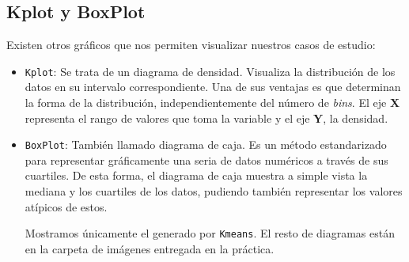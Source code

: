 	
	\begin{figure}[H]
		\centering
		
		
		
	\end{figure}
	
	
	\begin{figure}[H]
		\centering
		
	\end{figure}
	
	
	
	\subsection{Kplot y BoxPlot}
	
	Existen otros gráficos que nos permiten visualizar nuestros casos de estudio:
	\begin{itemize}
		\item \texttt{Kplot}: Se trata de un diagrama de densidad. Visualiza la distribución de los datos en su intervalo correspondiente. Una de sus ventajas es que determinan la forma de la distribución, independientemente del número de \textit{bins}. El eje \textbf{X} representa el rango de valores que toma la variable y el eje \textbf{Y}, la densidad.
		
		
		\begin{figure}[H]
			\centering
			
		\end{figure}
	
	
	
		\item \texttt{BoxPlot}: También llamado diagrama de caja. Es un método estandarizado para representar gráficamente una seria de datos numéricos a través de sus cuartiles. De esta forma, el diagrama de caja muestra a simple vista la mediana y los cuartiles de los datos, pudiendo también representar los valores atípicos de estos.
		
		Mostramos únicamente el generado por \texttt{Kmeans}. El resto de diagramas están en la carpeta de imágenes entregada en la práctica.
		
		\begin{figure}[H]
			\centering
			
		\end{figure}
	\end{itemize}
	
